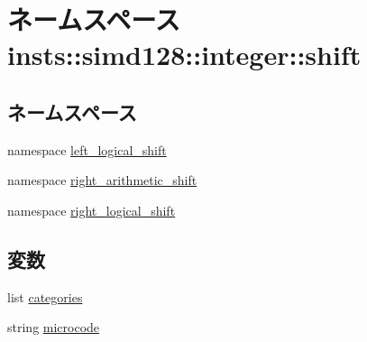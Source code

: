 \hypertarget{namespaceinsts_1_1simd128_1_1integer_1_1shift}{
\section{ネームスペース insts::simd128::integer::shift}
\label{namespaceinsts_1_1simd128_1_1integer_1_1shift}
}
\subsection*{ネームスペース}
\begin{DoxyCompactItemize}
\item 
namespace \hyperlink{namespaceinsts_1_1simd128_1_1integer_1_1shift_1_1left__logical__shift}{left\_\-logical\_\-shift}
\item 
namespace \hyperlink{namespaceinsts_1_1simd128_1_1integer_1_1shift_1_1right__arithmetic__shift}{right\_\-arithmetic\_\-shift}
\item 
namespace \hyperlink{namespaceinsts_1_1simd128_1_1integer_1_1shift_1_1right__logical__shift}{right\_\-logical\_\-shift}
\end{DoxyCompactItemize}
\subsection*{変数}
\begin{DoxyCompactItemize}
\item 
list \hyperlink{namespaceinsts_1_1simd128_1_1integer_1_1shift_a273cf0f1630af14c1582f05e53354a55}{categories}
\item 
string \hyperlink{namespaceinsts_1_1simd128_1_1integer_1_1shift_a770f11a173e99389a8802f0107ed8f52}{microcode}
\end{DoxyCompactItemize}


